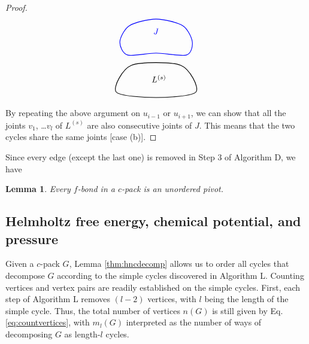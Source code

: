 \documentclass[preprint]{revtex4-1}
\newtheorem{lemm}[thrm]{Lemma}
\begin{document}
\begin{proof}
\[\begin{tikzpicture}
    \draw[draw=black, thick]
      plot [smooth cycle]
      coordinates{ ( 0.8*\sz, 0.6*\sz)
                   ( 2.4*\sz, 3.4*\sz)
                   ( 7.6*\sz, 3.4*\sz)
                   ( 9.2*\sz, 0.6*\sz)
                   ( 5.0*\sz, 0.0*\sz) };

    \node (L) at (5.3*\sz, 2.0*\sz) {$L^{(s)}$};

    \draw[thick, draw=blue]
      plot [smooth cycle]
      coordinates{
                   ( 2.0*\sz, 4.5*\sz)
                   ( 1.2*\sz, 5.9*\sz)
                   ( 2.2*\sz, 7.6*\sz)
                   ( 5.0*\sz, 8.3*\sz)
                   ( 7.8*\sz, 7.6*\sz)
                   ( 8.8*\sz, 5.9*\sz)
                   ( 8.2*\sz, 4.5*\sz)
                   ( 5.0*\sz, 4.7*\sz) };

    \node (J) at (5.0*\sz, 7.0*\sz) [blue] {$J$};
  \end{tikzpicture}
\]

By repeating the above argument on $u_{i-1}$ or $u_{i+1}$,
we can show that
  all the joints $v_1$, \dots $v_l$ of $L^{(s)}$
  are also consecutive joints of $J$.
%
This means that the two cycles share the same joints
  [case (b)].
\end{proof}



Since every edge (except the last one) is removed in Step 3 of Algorithm D,
we have
\begin{lemm}
  Every $f$-bond in a $c$-pack is an unordered pivot.
\label{thm:hncfpivot}
\end{lemm}




\subsection{\label{sec:hncFexmuex}Helmholtz free energy, chemical potential, and pressure}


Given a $c$-pack $G$,
  Lemma \ref{thm:hncdecomp} allows us
  to order all cycles that decompose $G$
  according to the simple cycles
  discovered in Algorithm L.
%
Counting vertices and vertex pairs
  are readily established on the simple cycles.
%
First, each step of Algorithm L removes $(l - 2)$ vertices,
  with $l$ being the length of the simple cycle.
%
Thus, the total number of vertices $n(G)$
  is still given by Eq. \eqref{eq:countvertices},
  with $m_l(G)$ interpreted as
  the number of ways
  of decomposing $G$ as length-$l$ cycles.
\end{document}
